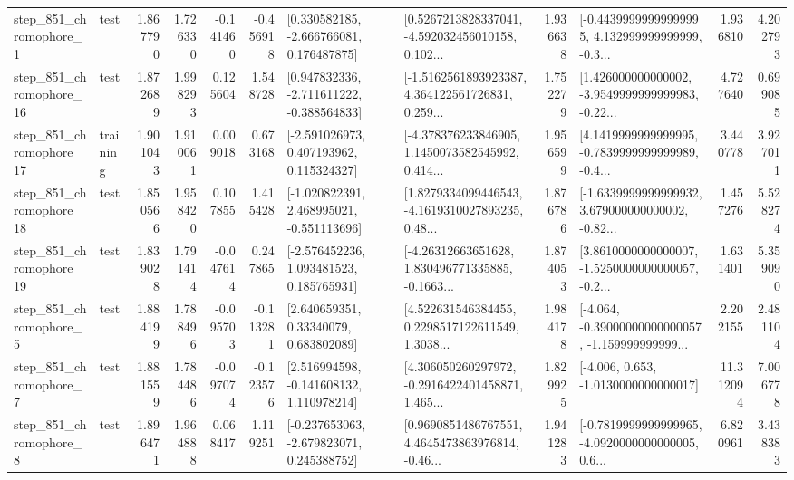\begin{tabular}{llrrrrllrlrr}
   step\_851\_chromophore\_1 &      test &      1.867790 &    1.726330 &     -0.141460 & -0.456918 &    [0.330582185, -2.666766081, 0.176487875] &  [0.5267213828337041, -4.592032456010158, 0.102... &       1.936638 &  [-0.44399999999999995, 4.132999999999999, -0.3... &            1.936810 &          4.202793 \\
  step\_851\_chromophore\_16 &      test &      1.872689 &    1.998293 &      0.125604 &  1.548728 &   [0.947832336, -2.711611222, -0.388564833] &  [-1.5162561893923387, 4.364122561726831, 0.259... &       1.752279 &  [1.426000000000002, -3.9549999999999983, -0.22... &            4.727640 &          0.699085 \\
  step\_851\_chromophore\_17 &  training &      1.901043 &    1.910061 &      0.009018 &  0.673168 &    [-2.591026973, 0.407193962, 0.115324327] &  [-4.378376233846905, 1.1450073582545992, 0.414... &       1.956599 &  [4.1419999999999995, -0.7839999999999989, -0.4... &            3.440778 &          3.927011 \\
  step\_851\_chromophore\_18 &      test &      1.850566 &    1.958420 &      0.107855 &  1.415428 &   [-1.020822391, 2.468995021, -0.551113696] &  [1.8279334099446543, -4.1619310027893235, 0.48... &       1.876786 &  [-1.6339999999999932, 3.679000000000002, -0.82... &            1.457276 &          5.528274 \\
  step\_851\_chromophore\_19 &      test &      1.839028 &    1.791414 &     -0.047614 &  0.247865 &    [-2.576452236, 1.093481523, 0.185765931] &  [-4.26312663651628, 1.830496771335885, -0.1663... &       1.874053 &  [3.8610000000000007, -1.5250000000000057, -0.2... &            1.631401 &          5.359090 \\
   step\_851\_chromophore\_5 &      test &      1.884199 &    1.788496 &     -0.095703 & -0.113281 &      [2.640659351, 0.33340079, 0.683802089] &  [4.522631546384455, 0.2298517122611549, 1.3038... &       1.984178 &  [-4.064, -0.39000000000000057, -1.159999999999... &            2.202155 &          2.481104 \\
   step\_851\_chromophore\_7 &      test &      1.881559 &    1.784486 &     -0.097074 & -0.123576 &    [2.516994598, -0.141608132, 1.110978214] &  [4.306050260297972, -0.2916422401458871, 1.465... &       1.829925 &               [-4.006, 0.653, -1.0130000000000017] &           11.312094 &          7.006778 \\
   step\_851\_chromophore\_8 &      test &      1.896471 &    1.964888 &      0.068417 &  1.119251 &   [-0.237653063, -2.679823071, 0.245388752] &  [0.9690851486767551, 4.4645473863976814, -0.46... &       1.941283 &  [-0.7819999999999965, -4.0920000000000005, 0.6... &            6.820961 &          3.438383 \\

\end{tabular}
